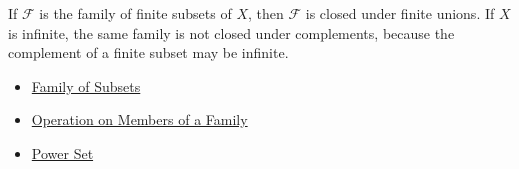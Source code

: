 \begin{remark*}[Examples]
If \(\mathcal{F}\) is the family of finite subsets of \(X\), then
\(\mathcal{F}\) is closed under finite unions.  If \(X\) is infinite, the same
family is not closed under complements, because the complement of a finite
subset may be infinite.
\end{remark*}

\begin{dependencies}
\begin{itemize}
  \item \hyperref[def:family-of-subsets]{Family of Subsets}
  \item \hyperref[def:operation-on-members-of-family]{Operation on Members of a Family}
  \item \hyperref[def:power-set]{Power Set}
\end{itemize}
\end{dependencies}
